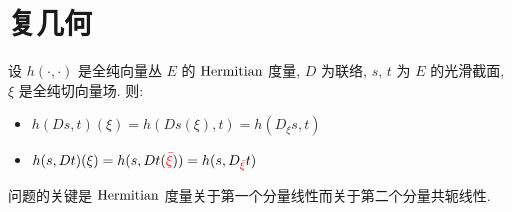 \chapter{复几何}

    \begin{example}
        设 $h(\cdot,\cdot)$ 是全纯向量丛 $E$ 的 ${\rm Hermitian}$ 度量, $D$ 为联络, $s,\,t$ 为 $E$ 的光滑截面, $\xi$ 是全纯切向量场. 则:
        \begin{itemize}
            \item $h(Ds,t)(\xi) = h(Ds(\xi),t)=h(D_{\xi}s,t)$
            \item $h(s,Dt)(\xi) = h(s,Dt(\textcolor{red}{\bar{\xi}}))=h(s,D_{\textcolor{red}{\bar{\xi}}}t)$ 
        \end{itemize}
        问题的关键是 ${\rm Hermitian}$ 度量关于第一个分量线性而关于第二个分量共轭线性.
    \end{example}